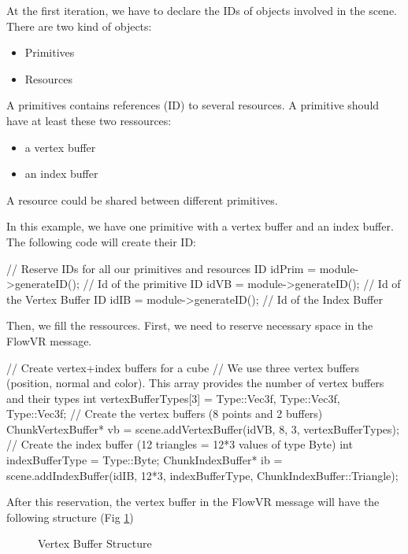 \documentclass[a4paper,12pt,titlepage]{article}
\begin{document}
At the first iteration, we have to declare the IDs of objects involved in the scene. There are two kind of objects:
\begin{itemize}
    \item Primitives
    \item Resources
\end{itemize}

A primitives contains references (ID) to several resources. A primitive should have at least these two ressources:
\begin{itemize}
	\item a vertex buffer
	\item an index buffer
\end{itemize}

A resource could be shared between different primitives.\par

In this example, we have one primitive with a vertex buffer and an index buffer. The following code will create their ID:

\begin{codeflowvr_cpp}
    // Reserve IDs for all our primitives and resources
    ID idPrim = module->generateID(); // Id of the primitive
    ID idVB = module->generateID(); // Id of the Vertex Buffer
    ID idIB = module->generateID(); // Id of the Index Buffer
\end{codeflowvr_cpp}  \par

Then, we fill the ressources. First, we need to reserve necessary space in the FlowVR message.

\begin{codeflowvr_cpp}
    // Create vertex+index buffers for a cube
    // We use three vertex buffers (position, normal and color). This array provides the number of vertex buffers and their types
    int vertexBufferTypes[3] = {Type::Vec3f, Type::Vec3f, Type::Vec3f};
    // Create the vertex buffers (8 points and 2 buffers)
    ChunkVertexBuffer* vb = scene.addVertexBuffer(idVB, 8, 3, vertexBufferTypes);
    // Create the index buffer (12 triangles = 12*3 values of type Byte)
    int indexBufferType = Type::Byte;
    ChunkIndexBuffer* ib = scene.addIndexBuffer(idIB, 12*3, indexBufferType, ChunkIndexBuffer::Triangle);
\end{codeflowvr_cpp} \par

After this reservation, the vertex buffer in the FlowVR message will have the following structure (Fig \ref{vbuffer})
\begin{figure}
    \caption{Vertex Buffer Structure}
    \label{vbuffer}
\end{figure}
\end{document}
